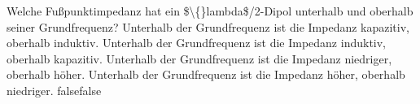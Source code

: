     {Welche Fußpunktimpedanz hat ein \$\textbackslash\{\}lambda\$/2-Dipol unterhalb und oberhalb seiner Grundfrequenz?}
    {Unterhalb der Grundfrequenz ist die Impedanz kapazitiv, oberhalb induktiv.}
    {Unterhalb der Grundfrequenz ist die Impedanz induktiv, oberhalb kapazitiv.}
    {Unterhalb der Grundfrequenz ist die Impedanz niedriger, oberhalb höher.}
    {Unterhalb der Grundfrequenz ist die Impedanz höher, oberhalb niedriger.}
    {false}{false}